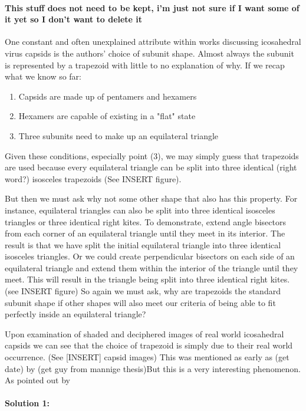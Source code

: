 \documentclass[12pt,letter]{article}
\begin{document}
\paragraph{This stuff does not need to be kept, i'm just not sure if I want some of it yet so I don't want to delete it}
One constant and often unexplained attribute within works discussing icosahedral virus capsids is the authors' choice of subunit shape. Almost always the subunit is represented by a trapezoid with little to no explanation of why. If we recap what we know so far:
\begin{enumerate}
	\item Capsids are made up of pentamers and hexamers
	\item Hexamers are capable of existing in a "flat" state
	\item Three subunits need to make up an equilateral triangle
\end{enumerate}
Given these conditions, especially point (3), we may simply guess that trapezoids are used because every equilateral triangle can be split into three identical (right word?) isosceles trapezoids (See INSERT figure). 

But then we must ask why not some other shape that also has this property. For instance, equilateral triangles can also be split into three identical isosceles triangles or three identical right kites. To demonstrate, extend angle bisectors from each corner of an equilateral triangle until they meet in its interior. The result is that we have split the initial equilateral triangle into three identical isosceles triangles. Or we could create perpendicular bisectors on each side of an equilateral triangle and extend them within the interior of the triangle until they meet. This will result in the triangle being split into three identical right kites. (see INSERT figure) So again we must ask, why are trapezoids the standard subunit shape if other shapes will also meet our criteria of being able to fit perfectly inside an equilateral triangle?

Upon examination of shaded and deciphered images of real world icosahedral capsids we can see that the choice of trapezoid is simply due to their real world occurrence. (See [INSERT] capsid images) This was mentioned as early as (get date) by (get guy from mannige thesis)But this is a very interesting phenomenon. As pointed out by 

\paragraph{Solution 1:}
\end{document}
